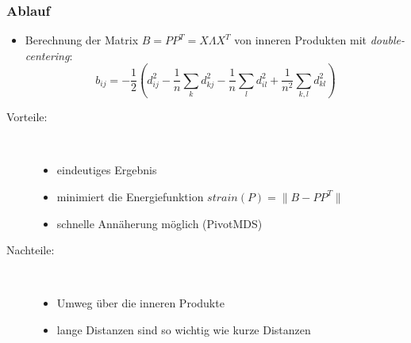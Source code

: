 \subsubsection{Ablauf}
\begin{itemize}
	\item Berechnung der Matrix $B=PP^T=X\Lambda X^T$ von inneren Produkten mit \textit{double-centering}:
		\[b_{ij}=-\dfrac{1}{2}\left(d_{ij}^2-\frac{1}{n}\sum\limits_{k}d_{kj}^2-\frac{1}{n}\sum\limits_{l}d_{il}^2+\frac{1}{n^2}\sum\limits_{k,l}d_{kl}^2\right)\]
\end{itemize}
\begin{description}
	\item[Vorteile:]\ \\\vspace*{-\baselineskip}
		\begin{itemize}
			\item eindeutiges Ergebnis
			\item minimiert die Energiefunktion $strain(P)=\|B-PP^T\|$
			\item schnelle Annäherung möglich (PivotMDS)
		\end{itemize}
	\item[Nachteile:]\ \\\vspace*{-\baselineskip}
		\begin{itemize}
			\item Umweg über die inneren Produkte
			\item lange Distanzen sind so wichtig wie kurze Distanzen
		\end{itemize}
\end{description}

